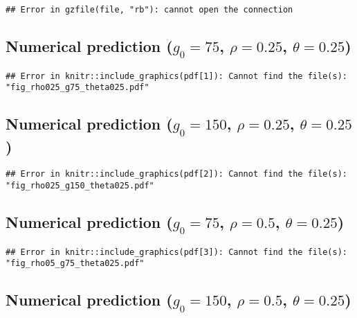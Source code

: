 \begin{verbatim}
## Error in gzfile(file, "rb"): cannot open the connection
\end{verbatim}

\subsection{\texorpdfstring{Numerical prediction (\(g_0=75\),
\(\rho=0.25\),
\(\theta=0.25\))}{Numerical prediction (g\_0=75, \textbackslash rho=0.25, \textbackslash theta=0.25)}}\label{numerical-prediction-g_075-rho0.25-theta0.25}

\begin{verbatim}
## Error in knitr::include_graphics(pdf[1]): Cannot find the file(s): "fig_rho025_g75_theta025.pdf"
\end{verbatim}

\newpage

\subsection{\texorpdfstring{Numerical prediction (\(g_0=150\),
\(\rho=0.25\),
\(\theta=0.25\))}{Numerical prediction (g\_0=150, \textbackslash rho=0.25, \textbackslash theta=0.25)}}\label{numerical-prediction-g_0150-rho0.25-theta0.25}

\begin{verbatim}
## Error in knitr::include_graphics(pdf[2]): Cannot find the file(s): "fig_rho025_g150_theta025.pdf"
\end{verbatim}

\newpage

\subsection{\texorpdfstring{Numerical prediction (\(g_0=75\),
\(\rho=0.5\),
\(\theta=0.25\))}{Numerical prediction (g\_0=75, \textbackslash rho=0.5, \textbackslash theta=0.25)}}\label{numerical-prediction-g_075-rho0.5-theta0.25}

\begin{verbatim}
## Error in knitr::include_graphics(pdf[3]): Cannot find the file(s): "fig_rho05_g75_theta025.pdf"
\end{verbatim}

\newpage

\subsection{\texorpdfstring{Numerical prediction (\(g_0=150\),
\(\rho=0.5\),
\(\theta=0.25\))}{Numerical prediction (g\_0=150, \textbackslash rho=0.5, \textbackslash theta=0.25)}}\label{numerical-prediction-g_0150-rho0.5-theta0.25}

